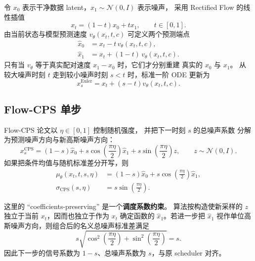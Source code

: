 \documentclass[11pt,a4paper]{article}
\begin{document}
令 $x_0$ 表示干净数据 latent，$x_1\sim\mathcal{N}(0,I)$ 表示噪声，
采用 Rectified Flow 的线性插值\cite{rectifiedflow}
\begin{equation}
  x_t=(1-t)x_0+t x_1,\qquad t\in[0,1].
  \label{eq:rf-interpolation}
\end{equation}
由当前状态与模型预测速度 $v_\theta(x_t,t,c)$ 可定义两个预测端点
\begin{align}
  \widehat{x}_0 &= x_t-t\,v_\theta(x_t,t,c), \label{eq:x0hat}\\
  \widehat{x}_1 &= x_t+(1-t)\,v_\theta(x_t,t,c). \label{eq:x1hat}
\end{align}
只有当 $v_\theta$ 等于真实配对速度 $x_1-x_0$ 时，它们才分别重建
真实的 $x_0$ 与 $x_1$。
从较大噪声时刻 $t$ 走到较小噪声时刻 $s<t$ 时，标准一阶 ODE 更新为
\begin{equation}
  x_s^{\mathrm{Euler}}
  =x_t+(s-t)v_\theta(x_t,t,c).
  \label{eq:euler}
\end{equation}

\subsection{Flow-CPS 单步}

Flow-CPS 论文\cite{flowcps}以 $\eta\in[0,1]$ 控制随机强度，
并把下一时刻 $s$ 的总噪声系数
分解为预测噪声方向与新高斯噪声方向：
\begin{equation}
  x_s^{\mathrm{CPS}}
  =(1-s)\widehat{x}_0
  +s\cos\!\left(\frac{\pi\eta}{2}\right)\widehat{x}_1
  +s\sin\!\left(\frac{\pi\eta}{2}\right)z,
  \qquad z\sim\mathcal{N}(0,I).
  \label{eq:flow-cps}
\end{equation}
如果把条件均值与随机标准差分开写，则
\begin{align}
  \mu_\theta(x_t,t,s,\eta)
    &=(1-s)\widehat{x}_0
      +s\cos\!\left(\frac{\pi\eta}{2}\right)\widehat{x}_1,\\
  \sigma_{\mathrm{CPS}}(s,\eta)
    &=s\sin\!\left(\frac{\pi\eta}{2}\right).
\end{align}

这里的 ``coefficients-preserving'' 是一个\textbf{调度系数约束}。
算法按构造使新采样的 $z$ 独立于当前 $x_t$，因而也独立于作为
$x_t$ 确定函数的 $\widehat{x}_1$。若进一步把 $\widehat{x}_1$
视作单位高斯噪声方向，则组合后的名义总噪声标准差满足
\begin{equation}
  s\sqrt{
    \cos^2\!\left(\frac{\pi\eta}{2}\right)
    +\sin^2\!\left(\frac{\pi\eta}{2}\right)}
  =s.
\end{equation}
因此下一步的信号系数为 $1-s$、总噪声系数为 $s$，与原 scheduler 对齐。
\end{document}
